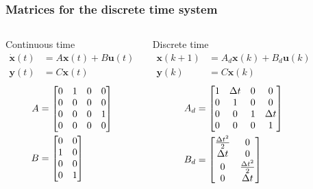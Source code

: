 \begin{frame} 
	\frametitle{Matrices for the discrete time system}
	\begin{columns}[onlytextwidth]
		\begin{block}{Continuous time}
			\vspace*{-1em}
			\begin{align*}
			\dot{\bm{x}}(t) &= A \bm{x}(t) + B \bm{u}(t)\\
			\bm{y}(t) &= C \bm{x}(t) 
			\end{align*}
			\vspace*{-2em}
			\begin{align*}
			A&=
			\begin{bmatrix}0&1&0&0\\0&0&0&0\\0&0&0&1\\0&0&0&0\end{bmatrix}
			\\
			B&=\begin{bmatrix}0&0\\ 1 &0\\0&0 \\0&1\end{bmatrix}
			\end{align*}
		\end{block}
		\centering
		\begin{block}{Discrete time \footnotemark}
			\vspace*{-1em}
			\begin{align*}
			\bm{x}(k+1) &= A_d \bm{x}(k) + B_d \bm{u}(k)\\
			\bm{y}(k) &= C \bm{x}(k) 
			\end{align*}
			\vspace*{-2em}
			\begin{align*}
			A_d&=\begin{bmatrix}1&\Delta t&0&0\\0&1&0&0\\0&0&1&\Delta t\\0&0&0&1\end{bmatrix}
			\\
			B_d&=\begin{bmatrix}\frac{\Delta t^2}{2}&0\\ \Delta t &0\\0&\frac{\Delta t^2}{2} \\0&\Delta t\end{bmatrix}
			\end{align*}
		\end{block}
	\end{columns}
\end{frame}

